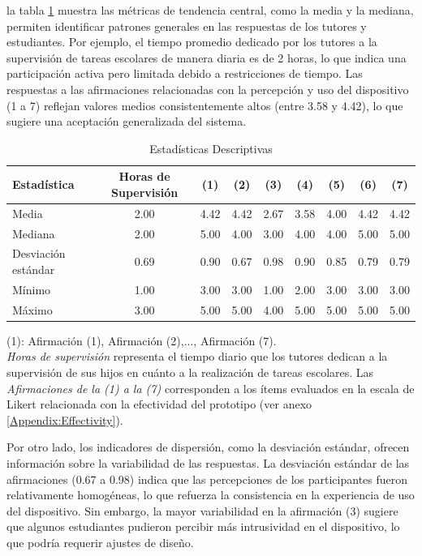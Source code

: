 \documentclass[a4paper,fleqn]{cas-sc}
\begin{document}
				la tabla \ref{table:DescriptiveStatistics} muestra las métricas de tendencia central, como la media y la mediana, permiten identificar patrones generales en las respuestas de los tutores y estudiantes. Por ejemplo, el tiempo promedio dedicado por los tutores a la supervisión de tareas escolares de manera diaria es de 2 horas, lo que indica una participación activa pero limitada debido a restricciones de tiempo. Las respuestas a las afirmaciones relacionadas con la percepción y uso del dispositivo (1 a 7) reflejan valores medios consistentemente altos (entre 3.58 y 4.42), lo que sugiere una aceptación generalizada del sistema.
				
				\begin{table}[h!]
					\centering
					\caption{Estadísticas Descriptivas}
					\begin{tabularx}{0.85\textwidth}{Xcccccccc}
						\toprule
						\textbf{Estadística} & \textbf{Horas de Supervisión} & \textbf{(1)} & \textbf{(2)} & \textbf{(3)} & \textbf{(4)} & \textbf{(5)} & \textbf{(6)} & \textbf{(7)} \\
						\midrule
						Media & 2.00 & 4.42 & 4.42 & 2.67 & 3.58 & 4.00 & 4.42 & 4.42 \\
						Mediana & 2.00 & 5.00 & 4.00 & 3.00 & 4.00 & 4.00 & 5.00 & 5.00 \\
						Desviación estándar & 0.69 & 0.90 & 0.67 & 0.98 & 0.90 & 0.85 & 0.79 & 0.79 \\
						Mínimo & 1.00 & 3.00 & 3.00 & 1.00 & 2.00 & 3.00 & 3.00 & 3.00 \\
						Máximo & 3.00 & 5.00 & 5.00 & 4.00 & 5.00 & 5.00 & 5.00 & 5.00 \\
						\bottomrule
					\end{tabularx}
					\label{table:DescriptiveStatistics}
					\vspace{0.3em} %
					\parbox{0.85\textwidth}{\footnotesize \centering
						(1): Afirmación (1), Afirmación (2),..., Afirmación (7).\\
						\textit{Horas de supervisión} representa el tiempo diario que los tutores dedican a la supervisión de sus hijos en cuánto a la realización de tareas escolares. Las \textit{Afirmaciones de la (1) a la (7)} corresponden a los ítems evaluados en la escala de Likert relacionada con la efectividad del prototipo (ver anexo \ref{Appendix:Effectivity}).
					}
				\end{table}
				
				Por otro lado, los indicadores de dispersión, como la desviación estándar, ofrecen información sobre la variabilidad de las respuestas. La desviación estándar de las afirmaciones (0.67 a 0.98) indica que las percepciones de los participantes fueron relativamente homogéneas, lo que refuerza la consistencia en la experiencia de uso del dispositivo. Sin embargo, la mayor variabilidad en la afirmación (3) sugiere que algunos estudiantes pudieron percibir más intrusividad en el dispositivo, lo que podría requerir ajustes de diseño.
				
\end{document}
